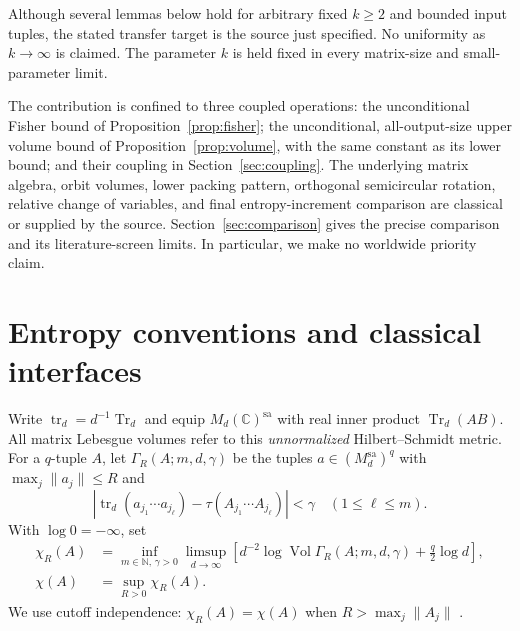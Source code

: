 \documentclass[11pt]{article}
\theoremstyle{definition}\newtheorem{definition}[theorem]{Definition}
\theoremstyle{remark}\newtheorem{remark}[theorem]{Remark}
\DeclareMathOperator{\Tr}{Tr}\DeclareMathOperator{\tr}{tr}
\DeclareMathOperator{\Vol}{Vol}\DeclareMathOperator{\rank}{rank}
\newcommand{\C}{\mathbb C}\newcommand{\R}{\mathbb R}
\newcommand{\N}{\mathbb N}\newcommand{\sa}{\mathrm{sa}}
\begin{document}
Although several lemmas below hold for arbitrary fixed $k\geq2$ and
bounded input tuples, the stated transfer target is the source just
specified. No uniformity as $k\to\infty$ is claimed. The parameter $k$
is held fixed in every matrix-size and small-parameter limit.

The contribution is confined to three coupled operations: the
unconditional Fisher bound of Proposition~\ref{prop:fisher}; the
unconditional, all-output-size upper volume bound of
Proposition~\ref{prop:volume}, with the same constant as its lower
bound; and their coupling in Section~\ref{sec:coupling}. The underlying
matrix algebra, orbit volumes, lower packing pattern, orthogonal
semicircular rotation, relative change of variables, and final
entropy-increment comparison are classical or supplied by the source.
Section~\ref{sec:comparison} gives the precise comparison and its
literature-screen limits. In particular, we make no worldwide priority
claim.

\section{Entropy conventions and classical interfaces}
\label{sec:conventions}
Write $\tr_d=d^{-1}\Tr_d$ and equip $M_d(\C)^{\sa}$ with real
inner product $\Tr_d(AB)$. All matrix Lebesgue volumes refer to this
\emph{unnormalized} Hilbert--Schmidt metric. For a $q$-tuple $A$, let
$\Gamma_R(A;m,d,\gamma)$ be the tuples $a\in(M_d^{\sa})^q$ with
$\max_j\|a_j\|\leq R$ and
\[
 |\tr_d(a_{j_1}\cdots a_{j_\ell})-
 \tau(A_{j_1}\cdots A_{j_\ell})|<\gamma
 \quad(1\leq\ell\leq m).
\]
With $\log0=-\infty$, set
\begin{align}
 \chi_R(A)&=\inf_{m\in\N,\,\gamma>0}\limsup_{d\to\infty}
 \left[d^{-2}\log\Vol\Gamma_R(A;m,d,\gamma)+\frac q2\log d\right],
 \label{eq:chi}\\
 \chi(A)&=\sup_{R>0}\chi_R(A).
\end{align}
We use cutoff independence: $\chi_R(A)=\chi(A)$ when
$R>\max_j\|A_j\|$ \cite{Vchi}.
\end{document}
